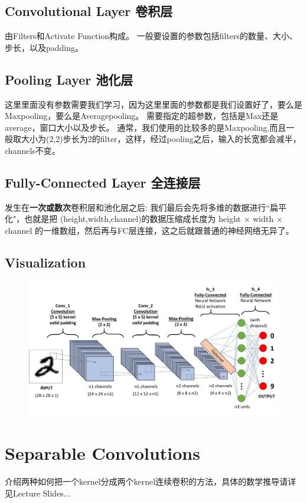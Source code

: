 \documentclass[11pt]{article}
\begin{document}
\subsection{Convolutional Layer 卷积层}
由Filters和Activate Function构成。 一般要设置的参数包括filters的数量、大小、步长，以及padding。

\subsection{Pooling Layer 池化层}
这里里面没有参数需要我们学习，因为这里里面的参数都是我们设置好了，要么是Maxpooling，要么是Averagepooling。 需要指定的超参数，包括是Max还是average，窗口大小以及步长。 通常，我们使用的比较多的是Maxpooling,而且一般取大小为(2,2)步长为2的filter，这样，经过pooling之后，输入的长宽都会减半，channels不变。

\subsection{Fully-Connected Layer 全连接层}
发生在\textbf{一次或数次}卷积层和池化层之后: 我们最后会先将多维的数据进行``扁平化"，也就是把 (height,width,channel)的数据压缩成长度为 height × width × channel 的一维数组，然后再与FC层连接，这之后就跟普通的神经网络无异了。

\subsection{Visualization}
\begin{figure}[hbt!]
  \centering
  \includegraphics[width=\textwidth]{assets/layers.jpeg}
\end{figure}


\section{Separable Convolutions}
介绍两种如何把一个kernel分成两个kernel连续卷积的方法，具体的数学推导请详见Lecture Slides...
\end{document}
